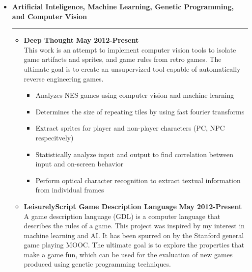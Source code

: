 \documentclass[overlapped]{res}
\begin{document}
\begin{resume}
\begin{itemize}[leftmargin=0in]
    \item[] \textbf{Artificial Inteligence, Machine Learning, Genetic Programming, and Computer Vision} \\[-0.1in] \rule{\textwidth}{0.5pt}
        \begin{itemize}[leftmargin=0in]
            \item[] 
                \begin{samepage}
                    \textbf{Deep Thought} \hfill \textbf{May 2012-Present} \\
                    This work is an attempt to implement computer vision tools to isolate game artifacts and 
                    sprites, and game rules from retro games. The ultimate goal is to create an unsupervized tool capable of automatically 
                    reverse engineering games.
                    \begin{itemize}
                        \item[\textbullet] Analyzes NES games using computer vision and machine learning
                        \item[\textbullet] Determines the size of repeating tiles by using fast fourier transforms
                        \item[\textbullet] Extract sprites for player and non-player characters (PC, NPC respecitvely)
                        \item[\textbullet] Statistically analyze input and output to find correlation between input and on-screen behavior
                        \item[\textbullet] Perform optical character recognition to extract textual information from individual frames
                    \end{itemize}
                \end{samepage}
            \item[] 
                \begin{samepage}
                    \textbf{LeisurelyScript Game Description Language} \hfill \textbf{May 2012-Present} \\
                    A game description language (GDL) is a computer language that describes the rules of a game. 
                    This project was inspired by my interest in machine learning and AI. It has been spurred on by the 
                    Stanford general game playing MOOC. The ultimate goal is to explore the properties that make a game
                    fun, which can be used for the evaluation of new games produced using genetic programming techniques. 

\end{samepage}
\end{itemize}
\end{itemize}
\end{resume}
\end{document}
